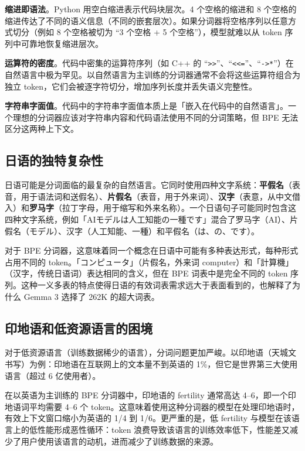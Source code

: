 \textbf{缩进即语法}。Python 用空白缩进表示代码块层次。4 个空格的缩进和 8 个空格的缩进传达了不同的语义信息（不同的嵌套层次）。如果分词器将空格序列以任意方式切分（例如 8 个空格被切为 “3 个空格 + 5 个空格”），模型就难以从 token 序列中可靠地恢复缩进层次。

\textbf{运算符的密度}。代码中密集的运算符序列（如 C++ 的 “\texttt{>>}”、“\texttt{<<=}”、“\texttt{->*}”）在自然语言中极为罕见。以自然语言为主训练的分词器通常不会将这些运算符组合为独立 token，它们会被逐字符切分，增加序列长度并丢失语义完整性。

\textbf{字符串字面值}。代码中的字符串字面值本质上是「嵌入在代码中的自然语言」。一个理想的分词器应该对字符串内容和代码语法使用不同的分词策略，但 BPE 无法区分这两种上下文。

\subsection{日语的独特复杂性}

日语可能是分词面临的最复杂的自然语言。它同时使用四种文字系统：\textbf{平假名}（表音，用于语法词和送假名）、\textbf{片假名}（表音，用于外来词）、\textbf{汉字}（表意，从中文借入）和\textbf{罗马字}（拉丁字母，用于缩写和外来名称）。一个日语句子可能同时包含这四种文字系统，例如「AIモデルは人工知能の一種です」混合了罗马字（AI）、片假名（モデル）、汉字（人工知能、一種）和平假名（は、の、です）。

对于 BPE 分词器，这意味着同一个概念在日语中可能有多种表达形式，每种形式占用不同的 token。「コンピュータ」（片假名，外来词 computer）和「計算機」（汉字，传统日语词）表达相同的含义，但在 BPE 词表中是完全不同的 token 序列。这种一义多表的特点使得日语的有效词表需求远大于表面看到的，也解释了为什么 Gemma 3 选择了 262K 的超大词表。

\subsection{印地语和低资源语言的困境}

对于低资源语言（训练数据稀少的语言），分词问题更加严峻。以印地语（天城文书写）为例：印地语在互联网上的文本量不到英语的 1\%，但它是世界第三大使用语言（超过 6 亿使用者）。

在以英语为主训练的 BPE 分词器中，印地语的 fertility 通常高达 4--6，即一个印地语词平均需要 4--6 个 token。这意味着使用这种分词器的模型在处理印地语时，有效上下文窗口缩小为英语的 1/4 到 1/6。更严重的是，低 fertility 与模型在该语言上的低性能形成恶性循环：token 浪费导致该语言的训练效率低下，性能差又减少了用户使用该语言的动机，进而减少了训练数据的来源。

